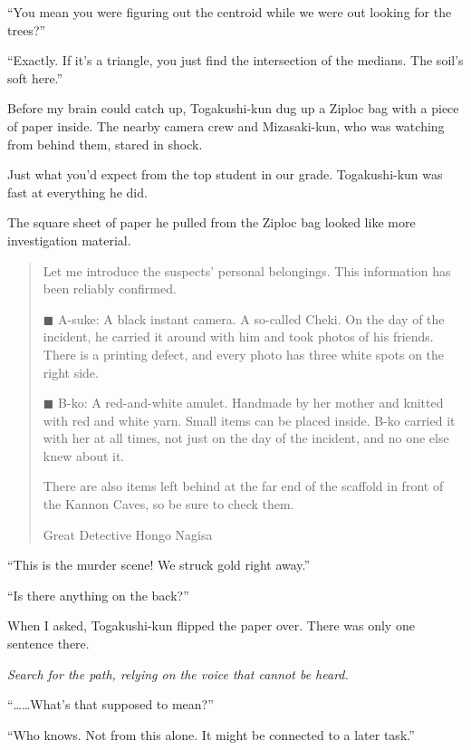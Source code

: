 \documentclass[
    a4paper,
    12pt,
    twoside,
    openany,
    UTF8,
    fontset=windows
]{ctexbook}
\begin{document}
``You mean you were figuring out the centroid while we were out looking for the trees?''

``Exactly. If it's a triangle, you just find the intersection of the medians. The soil's soft here.''

Before my brain could catch up, Togakushi-kun dug up a Ziploc bag with a piece of paper inside. The nearby camera crew and Mizasaki-kun, who was watching from behind them, stared in shock.

Just what you'd expect from the top student in our grade. Togakushi-kun was fast at everything he did.

The square sheet of paper he pulled from the Ziploc bag looked like more investigation material.

\begin{quote}
Let me introduce the suspects' personal belongings. This information has been reliably confirmed.

\noindent $\blacksquare$ A-suke: A black instant camera. A so-called Cheki. On the day of the incident, he carried it around with him and took photos of his friends. There is a printing defect, and every photo has three white spots on the right side.

\noindent $\blacksquare$ B-ko: A red-and-white amulet. Handmade by her mother and knitted with red and white yarn. Small items can be placed inside. B-ko carried it with her at all times, not just on the day of the incident, and no one else knew about it.

There are also items left behind at the far end of the scaffold in front of the Kannon Caves, so be sure to check them.

\begin{flushright}
Great Detective Hongo Nagisa
\end{flushright}
\end{quote}

``This is the murder scene! We struck gold right away.''

``Is there anything on the back?''

When I asked, Togakushi-kun flipped the paper over. There was only one sentence there.

\begin{center}
\textit{Search for the path, relying on the voice that cannot be heard.}
\end{center}

``\dots\dots What's that supposed to mean?''

``Who knows. Not from this alone. It might be connected to a later task.''
\end{document}
